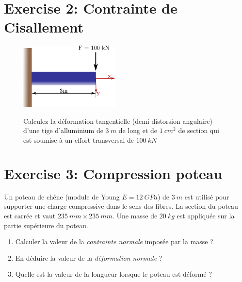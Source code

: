 \documentclass[
]{article}
\providecommand{\tightlist}{%
  \setlength{\itemsep}{0pt}\setlength{\parskip}{0pt}}\usepackage{longtable,booktabs,array}
\begin{document}
\hypertarget{exercise-2-contrainte-de-cisallement}{%
\section{Exercise 2: Contrainte de
Cisallement}\label{exercise-2-contrainte-de-cisallement}}

\begin{figure}

\begin{minipage}[c]{0.40\linewidth}

{\centering 

\includegraphics[width=5cm,height=\textheight]{../assets/img/TD1/Ex2.png}

}

\end{minipage}%
%
\begin{minipage}[c]{0.60\linewidth}

{\centering 

Calculez la déformation tangentielle (demi distorsion angulaire) d'une
tige d'alluminium de \(3~m\) de long et de \(1~cm^{2}\) de section qui
est soumise à un effort transversal de \(100~kN\)

}

\end{minipage}%

\end{figure}

\hypertarget{exercise-3-compression-poteau}{%
\section{Exercise 3: Compression
poteau}\label{exercise-3-compression-poteau}}

Un poteau de chêne (module de Young \(E= 12~GPa\)) de \(3~m\) est
utilisé pour supporter une charge compressive dans le sens des fibres.
La section du poteau est carrée et vaut \(235~mm \times 235~mm\). Une
masse de \(20~kg\) est appliquée sur la partie supérieure du poteau.

\begin{enumerate}
\def\labelenumi{\arabic{enumi}.}
\tightlist
\item
  Calculer la valeur de la \emph{contrainte normale} imposée par la
  masse ?
\item
  En déduire la valeur de la \emph{déformation normale} ?
\item
  Quelle est la valeur de la longueur lorsque le poteau est déformé ?
\end{enumerate}
\end{document}
